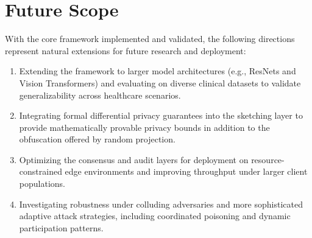 


\section{Future Scope}
With the core framework implemented and validated, the following directions represent natural extensions for future research and deployment:
\begin{enumerate}
    \item Extending the framework to larger model architectures (e.g., ResNets and Vision Transformers) and evaluating on diverse clinical datasets to validate generalizability across healthcare scenarios.
    \item Integrating formal differential privacy guarantees into the sketching layer to provide mathematically provable privacy bounds in addition to the obfuscation offered by random projection.
    \item Optimizing the consensus and audit layers for deployment on resource-constrained edge environments and improving throughput under larger client populations.
    \item Investigating robustness under colluding adversaries and more sophisticated adaptive attack strategies, including coordinated poisoning and dynamic participation patterns.
\end{enumerate}


